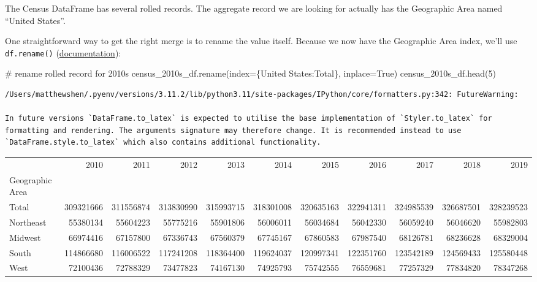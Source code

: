 \documentclass[
  letterpaper,
  DIV=11,
  numbers=noendperiod]{scrreprt}
\newenvironment{Shaded}{\begin{snugshade}}{\end{snugshade}}
\newcommand{\CommentTok}[1]{\textcolor[rgb]{0.37,0.37,0.37}{#1}}
\newcommand{\DecValTok}[1]{\textcolor[rgb]{0.68,0.00,0.00}{#1}}
\newcommand{\NormalTok}[1]{\textcolor[rgb]{0.00,0.23,0.31}{#1}}
\newcommand{\OperatorTok}[1]{\textcolor[rgb]{0.37,0.37,0.37}{#1}}
\newcommand{\StringTok}[1]{\textcolor[rgb]{0.13,0.47,0.30}{#1}}
\newcommand{\VariableTok}[1]{\textcolor[rgb]{0.07,0.07,0.07}{#1}}
\begin{document}
The Census DataFrame has several rolled records. The aggregate record we
are looking for actually has the Geographic Area named ``United
States''.

One straightforward way to get the right merge is to rename the value
itself. Because we now have the Geographic Area index, we'll use
\texttt{df.rename()}
(\href{https://pandas.pydata.org/docs/reference/api/pandas.DataFrame.rename.html}{documentation}):

\begin{Shaded}
\begin{Highlighting}[]
\CommentTok{\# rename rolled record for 2010s}
\NormalTok{census\_2010s\_df.rename(index}\OperatorTok{=}\NormalTok{\{}\StringTok{\textquotesingle{}United States\textquotesingle{}}\NormalTok{:}\StringTok{\textquotesingle{}Total\textquotesingle{}}\NormalTok{\}, inplace}\OperatorTok{=}\VariableTok{True}\NormalTok{)}
\NormalTok{census\_2010s\_df.head(}\DecValTok{5}\NormalTok{)}
\end{Highlighting}
\end{Shaded}

\begin{verbatim}
/Users/matthewshen/.pyenv/versions/3.11.2/lib/python3.11/site-packages/IPython/core/formatters.py:342: FutureWarning:

In future versions `DataFrame.to_latex` is expected to utilise the base implementation of `Styler.to_latex` for formatting and rendering. The arguments signature may therefore change. It is recommended instead to use `DataFrame.style.to_latex` which also contains additional functionality.
\end{verbatim}

\begin{tabular}{lrrrrrrrrrr}
\toprule
{} &       2010 &       2011 &       2012 &       2013 &       2014 &       2015 &       2016 &       2017 &       2018 &       2019 \\
Geographic Area &            &            &            &            &            &            &            &            &            &            \\
\midrule
Total           &  309321666 &  311556874 &  313830990 &  315993715 &  318301008 &  320635163 &  322941311 &  324985539 &  326687501 &  328239523 \\
Northeast       &   55380134 &   55604223 &   55775216 &   55901806 &   56006011 &   56034684 &   56042330 &   56059240 &   56046620 &   55982803 \\
Midwest         &   66974416 &   67157800 &   67336743 &   67560379 &   67745167 &   67860583 &   67987540 &   68126781 &   68236628 &   68329004 \\
South           &  114866680 &  116006522 &  117241208 &  118364400 &  119624037 &  120997341 &  122351760 &  123542189 &  124569433 &  125580448 \\
West            &   72100436 &   72788329 &   73477823 &   74167130 &   74925793 &   75742555 &   76559681 &   77257329 &   77834820 &   78347268 \\
\bottomrule
\end{tabular}
\end{document}
